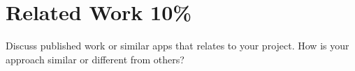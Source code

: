 \section{Related Work 10\%}
Discuss published work or similar apps that relates to your project. How is your approach similar or different from others?
